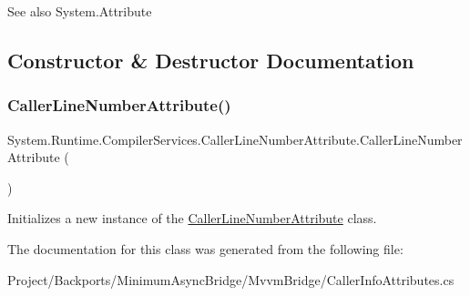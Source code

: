 \begin{DoxySeeAlso}{See also}
System.\+Attribute


\end{DoxySeeAlso}


\subsection{Constructor \& Destructor Documentation}
\mbox{\label{class_system_1_1_runtime_1_1_compiler_services_1_1_caller_line_number_attribute_ad0fc848bfebd180096a0dea769719703}} 
\subsubsection{\texorpdfstring{Caller\+Line\+Number\+Attribute()}{CallerLineNumberAttribute()}}
{\footnotesize\ttfamily System.\+Runtime.\+Compiler\+Services.\+Caller\+Line\+Number\+Attribute.\+Caller\+Line\+Number\+Attribute (\begin{DoxyParamCaption}{ }\end{DoxyParamCaption})\hspace{0.3cm}{\ttfamily [inline]}}



Initializes a new instance of the \hyperlink{class_system_1_1_runtime_1_1_compiler_services_1_1_caller_line_number_attribute}{Caller\+Line\+Number\+Attribute} class. 



The documentation for this class was generated from the following file\+:\begin{DoxyCompactItemize}
\item 
Project/\+Backports/\+Minimum\+Async\+Bridge/\+Mvvm\+Bridge/Caller\+Info\+Attributes.\+cs\end{DoxyCompactItemize}
